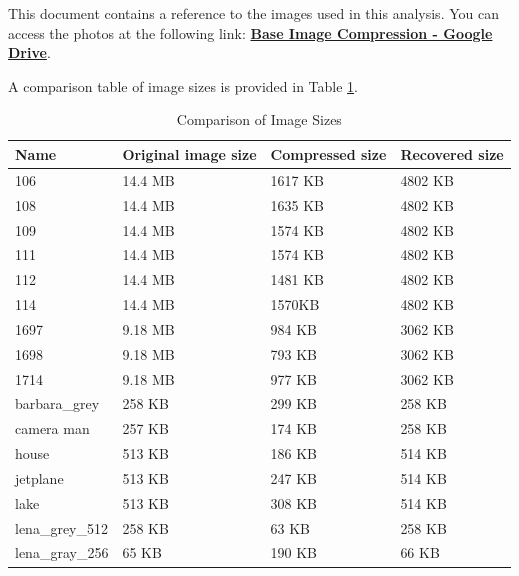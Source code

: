 \documentclass{article}
\begin{document}
This document contains a reference to the images used in this analysis. You can access the photos at the following link:  
\href{https://drive.google.com/drive/folders/1LGpUmurv2-XydOflUQNKCwBrPhe4YOIw?usp=sharing}{\textbf{Base Image Compression - Google Drive}}.

A comparison table of image sizes is provided in Table \ref{tab:image_sizes}.

\begin{table}[!htb]
\centering

\caption{Comparison of Image Sizes}
\label{tab:image_sizes}
\begin{tabular}{llll}
\toprule
          Name & Original image size & Compressed size & Recovered size \\
\midrule
           106 &             14.4 MB &         1617 KB &        4802 KB \\
           108 &             14.4 MB &         1635 KB &        4802 KB \\
           109 &             14.4 MB &         1574 KB &        4802 KB \\
           111 &             14.4 MB &         1574 KB &        4802 KB \\
           112 &             14.4 MB &         1481 KB &        4802 KB \\
           114 &             14.4 MB &          1570KB &        4802 KB \\
          1697 &             9.18 MB &          984 KB &        3062 KB \\
          1698 &             9.18 MB &          793 KB &        3062 KB \\
          1714 &             9.18 MB &          977 KB &        3062 KB \\
  barbara\_grey &              258 KB &          299 KB &         258 KB \\
    camera man &              257 KB &          174 KB &         258 KB \\
         house &              513 KB &          186 KB &         514 KB \\
      jetplane &              513 KB &          247 KB &         514 KB \\
          lake &              513 KB &          308 KB &         514 KB \\
 lena\_grey\_512 &              258 KB &           63 KB &         258 KB \\
 lena\_gray\_256 &               65 KB &          190 KB &          66 KB \\

\end{tabular}
\end{table}
\end{document}
